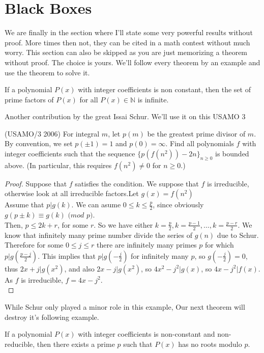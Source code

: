 \section{Black Boxes}
We are finally in the section where I'll state some very powerful results without proof. More times then not, they can be cited in a math contest without much worry. This section can also be skipped as you are just memorizing a theorem without proof. The choice is yours. We'll follow every theorem by an example and use the theorem to solve it.\\
\begin{theorem}
    If a polynomial $P(x)$ with integer coefficients is non constant, then the set of prime factors of $P(x)$ for all $P(x) \in \mathbb{N}$ is infinite.
\end{theorem}
Another contribution by the great Issai Schur. We'll use it on this USAMO 3\\
\begin{example}
    (USAMO/3 2006)
    For integral $m$, let $p(m)$ be the greatest prime divisor of $m$. By convention, we set $p(\pm1)=1$ and $p(0)=\infty$. Find all polynomials $f$ with integer coefficients such that the sequence $\lbrace p(f(n^2))-2n\rbrace_{n\ge0}$ is bounded above. (In particular, this requires $f(n^2)\neq0$ for $n\ge0$.)
\end{example}
\begin{proof}
     Suppose that $f$ satisfies the condition. We suppose that $f$ is irreducible, otherwise look at all irreducible factors.Let $g(x)=f(n^2)$\\
     Assume that $p|g(k)$. We can asume $0\leq k \leq \frac p2$, since obviously $g(p\pm k)\equiv g(k)$ $(mod$ $p)$.\\
     Then, $p \leq 2k+r$, for some $r$. So we have either $k=\frac p2, k=\frac{p-1}2, \ldots,k=\frac{p-r}2$. We know that infinitely many prime number divide the series of  $g(n)$ due to Schur. Therefore for some $0\leq j \leq r$ there are infinitely many primes $p$ for which $p|g(\frac{p-j}2)$. This implies that $p|g(-\frac j2)$ for infinitely many $p$, so $g(-\frac j2)=0$, thus $2x+j|g(x^2)$, and also $2x-j|g(x^2)$, so $4x^2-j^2|g(x)$, so $4x-j^2|f(x)$. As $f$ is irreducible, $f=4x-j^2$.\\
\end{proof}
While Schur only played a minor role in this example, Our next theorem will destroy it's following example.\\
\begin{theorem}
    If a polynomial $P(x)$ with integer coefficients is non-constant and non-reducible, then there exists a prime $p$ such that $P(x)$ has no roots modulo $p$.
\end{theorem}
